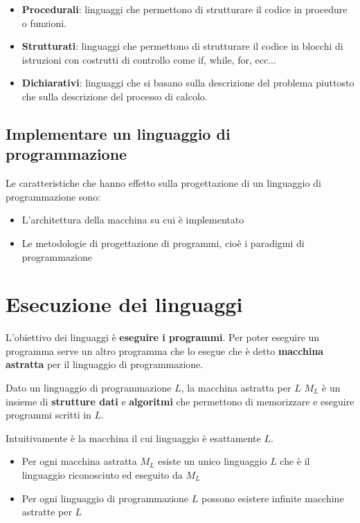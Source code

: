 \documentclass[a4paper]{article}
\begin{document}
\begin{itemize}
\begin{itemize}
      \item \textbf{Procedurali}: linguaggi che permettono di strutturare il codice in procedure
        o funzioni.

      \item \textbf{Strutturati}: linguaggi che permettono di strutturare il codice in blocchi di istruzioni
        con costrutti di controllo come if, while, for, ecc...

      \item \textbf{Dichiarativi}: linguaggi che si basano sulla descrizione del problema
        piuttosto che sulla descrizione del processo di calcolo.
    \end{itemize}
\end{itemize}

\subsection{Implementare un linguaggio di programmazione}
Le caratteristiche che hanno effetto sulla progettazione di un linguaggio di programmazione
sono:
\begin{itemize}
  \item L'architettura della macchina su cui è implementato
  \item Le metodologie di progettazione di programmi, cioè i paradigmi di programmazione
\end{itemize}

\section{Esecuzione dei linguaggi}
L'obiettivo dei linguaggi è \textbf{eseguire i programmi}.
Per poter eseguire un programma serve un altro programma che lo esegue che è detto
\textbf{macchina astratta} per il linguaggio di programmazione.

\begin{definition}
  Dato un linguaggio di programmazione \( L \), la macchina astratta per \( L \)
  \( M_L \) è un insieme di \textbf{strutture dati} e \textbf{algoritmi} che permettono
  di memorizzare e eseguire programmi scritti in \( L \).

  \vspace{1em}
  \noindent
  Intuitivamente è la macchina il cui linguaggio è esattamente \( L \).

  \begin{itemize}
    \item Per ogni macchina astratta \( M_L \) esiste un unico linguaggio \( L \) 
      che è il linguaggio riconosciuto ed eseguito da \( M_L \) 
    \item Per ogni linguaggio di programmazione \( L \) possono esistere
      infinite macchine astratte per \( L \) 
  \end{itemize}
\end{definition}
\end{document}
